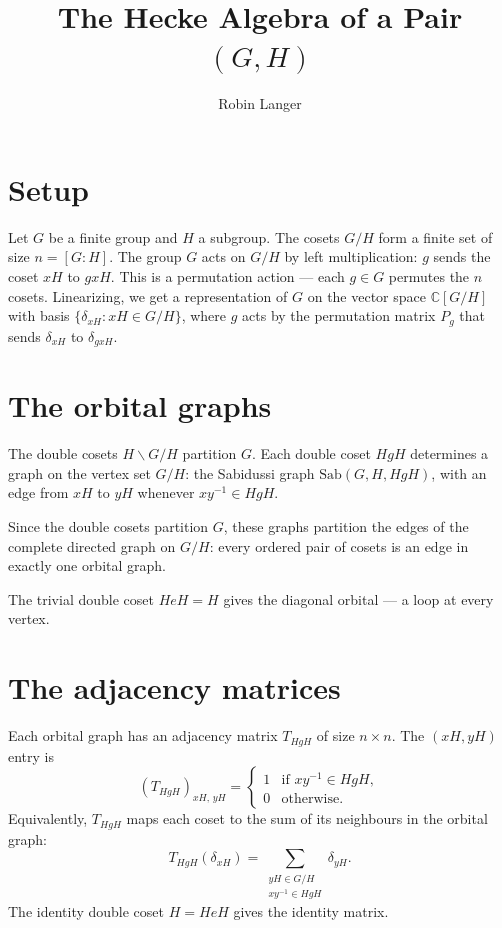 \documentclass[12pt]{article}
\title{The Hecke Algebra of a Pair $(G,H)$}
\author{Robin Langer}
\date{}
\begin{document}
\maketitle

\section{Setup}

Let $G$ be a finite group and $H$ a subgroup. The cosets $G/H$ form a finite set of size $n = [G:H]$. The group $G$ acts on $G/H$ by left multiplication: $g$ sends the coset $xH$ to $gxH$. This is a permutation action --- each $g \in G$ permutes the $n$ cosets. Linearizing, we get a representation of $G$ on the vector space $\mathbb{C}[G/H]$ with basis $\{\delta_{xH} : xH \in G/H\}$, where $g$ acts by the permutation matrix $P_g$ that sends $\delta_{xH}$ to $\delta_{gxH}$.

\section{The orbital graphs}

The double cosets $H \backslash G / H$ partition $G$. Each double coset $HgH$ determines a graph on the vertex set $G/H$: the Sabidussi graph $\mathrm{Sab}(G, H, HgH)$, with an edge from $xH$ to $yH$ whenever $xy^{-1} \in HgH$.

Since the double cosets partition $G$, these graphs partition the edges of the complete directed graph on $G/H$: every ordered pair of cosets is an edge in exactly one orbital graph.

The trivial double coset $HeH = H$ gives the diagonal orbital --- a loop at every vertex.

\section{The adjacency matrices}

Each orbital graph has an adjacency matrix $T_{HgH}$ of size $n \times n$. The $(xH, yH)$ entry is
\[
(T_{HgH})_{xH,\, yH} = \begin{cases} 1 & \text{if } xy^{-1} \in HgH, \\ 0 & \text{otherwise.} \end{cases}
\]
Equivalently, $T_{HgH}$ maps each coset to the sum of its neighbours in the orbital graph:
\[
T_{HgH}(\delta_{xH}) = \sum_{\substack{yH \in G/H \\ xy^{-1} \in HgH}} \delta_{yH}.
\]
The identity double coset $H = HeH$ gives the identity matrix.
\end{document}
